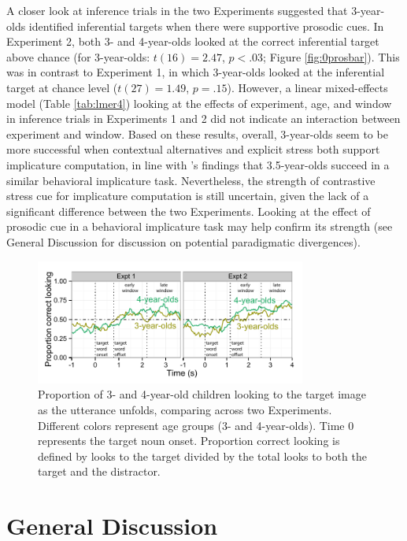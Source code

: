 \documentclass[10pt,letterpaper]{article}
\begin{document}
A closer look at inference trials in the two Experiments suggested that 3-year-olds identified inferential targets when there were supportive prosodic cues. In Experiment 2, both 3- and 4-year-olds looked at the correct inferential target above chance (for 3-year-olds: $t(16) = 2.47$, $p < .03$; Figure \ref{fig:0prosbar}). This was in contrast to Experiment 1, in which 3-year-olds looked at the inferential target at chance level ($t(27) = 1.49$, $p = .15$). However, a linear mixed-effects model (Table \ref{tab:lmer4}) looking at the effects of experiment, age, and window in inference trials in Experiments 1 and 2 did not indicate an interaction between experiment and window. Based on these results, overall, 3-year-olds seem to be more successful when contextual alternatives and explicit stress both support implicature computation, in line with 's findings that 3.5-year-olds succeed in a similar behavioral implicature task. Nevertheless, the strength of contrastive stress cue for implicature computation is still uncertain, given the lack of a significant difference between the two Experiments. Looking at the effect of prosodic cue in a behavioral implicature task may help confirm its strength (see General Discussion for discussion on potential paradigmatic divergences). 

\begin{figure}[t]
\begin{center} 
\includegraphics[width=3.5in]{figures/expt2-accuracy.pdf}
\caption{\label{fig:pros0} Proportion of 3- and 4-year-old children looking to the target image as the utterance unfolds, comparing across two Experiments. Different colors represent age groups (3- and 4-year-olds). Time 0 represents the target noun onset. Proportion correct looking is defined by looks to the target divided by the total looks to both the target and the distractor.}
\end{center} 
\end{figure}

\section{General Discussion}
\end{document}
